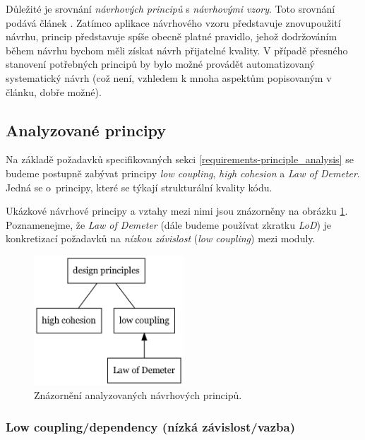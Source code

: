 Důležité je srovnání \emph{návrhových principů} s \emph{návrhovými vzory}. Toto srovnání podává článek \cite{612257}. Zatímco aplikace návrhového vzoru představuje znovupoužití  návrhu, princip představuje spíše obecně platné pravidlo, jehož dodržováním během návrhu bychom měli získat návrh přijatelné kvality. V případě přesného stanovení potřebných principů by bylo možné provádět automatizovaný systematický návrh (což není, vzhledem k mnoha aspektům popisovaným v článku, dobře možné).

\subsection{Analyzované principy}
Na základě požadavků specifikovaných sekci \ref{requirements-principle_analysis} se budeme postupně zabývat principy \emph{low coupling}, \emph{high cohesion} a \emph{Law of Demeter}. Jedná se o~principy, které se týkají strukturální kvality kódu.

Ukázkové návrhové principy a vztahy mezi nimi jsou znázorněny na obrázku \ref{analyzed_principles}. Poznamenejme, že \emph{Law of Demeter} (dále budeme používat zkratku \emph{LoD}) je konkretizací požadavků na \emph{nízkou závislost} (\emph{low coupling}) mezi moduly.

\begin{figure}[h!]
  \centering
  \includegraphics[width=0.5\textwidth]{./graphs/oop_design_principles.png}
  \caption{Znázornění analyzovaných návrhových principů.\label{analyzed_principles}}
\end{figure}

\subsubsection{Low coupling/dependency (nízká závislost/vazba)}


